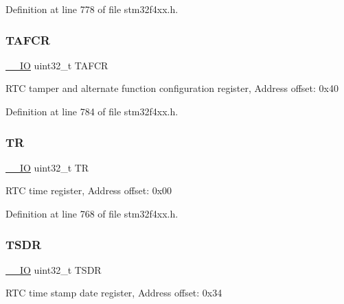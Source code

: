 Definition at line 778 of file stm32f4xx.\+h.

\mbox{\label{struct_r_t_c___type_def_a14d03244a7fda1d94b51ae9ed144ca12}} 
\subsubsection{\texorpdfstring{T\+A\+F\+CR}{TAFCR}}
{\footnotesize\ttfamily \hyperlink{group___c_m_s_i_s__core__definitions_gaec43007d9998a0a0e01faede4133d6be}{\+\_\+\+\_\+\+IO} uint32\+\_\+t T\+A\+F\+CR}

R\+TC tamper and alternate function configuration register, Address offset\+: 0x40 

Definition at line 784 of file stm32f4xx.\+h.

\mbox{\label{struct_r_t_c___type_def_a63d179b7a36a715dce7203858d3be132}} 
\subsubsection{\texorpdfstring{TR}{TR}}
{\footnotesize\ttfamily \hyperlink{group___c_m_s_i_s__core__definitions_gaec43007d9998a0a0e01faede4133d6be}{\+\_\+\+\_\+\+IO} uint32\+\_\+t TR}

R\+TC time register, Address offset\+: 0x00 

Definition at line 768 of file stm32f4xx.\+h.

\mbox{\label{struct_r_t_c___type_def_abeb6fb580a8fd128182aa9ba2738ac2c}} 
\subsubsection{\texorpdfstring{T\+S\+DR}{TSDR}}
{\footnotesize\ttfamily \hyperlink{group___c_m_s_i_s__core__definitions_gaec43007d9998a0a0e01faede4133d6be}{\+\_\+\+\_\+\+IO} uint32\+\_\+t T\+S\+DR}

R\+TC time stamp date register, Address offset\+: 0x34 

